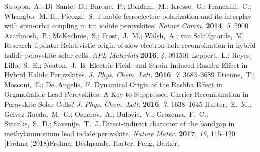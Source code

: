 \documentclass[journal=jpccck,manuscript=article,layout=twocolumn]{achemso}
\begin{document}
\begin{mcitethebibliography}{62}
\EndOfBibitem
{}
Stroppa,~A.; Di~Sante,~D.; Barone,~P.; Bokdam,~M.; Kresse,~G.; Franchini,~C.;
  Whangbo,~M.-H.; Picozzi,~S. Tunable ferroelectric polarization and its
  interplay with spin-orbit coupling in tin iodide perovskites. \emph{Nature
  Comm.} \textbf{2014}, \emph{5}, 5900\relax
\mciteBstWouldAddEndPuncttrue
\mciteSetBstMidEndSepPunct{\mcitedefaultmidpunct}
{\mcitedefaultendpunct}{\mcitedefaultseppunct}\relax
\EndOfBibitem
{}
Azarhoosh,~P.; McKechnie,~S.; Frost,~J.~M.; Walsh,~A.; van Schilfgaarde,~M.
  Research Update: Relativistic origin of slow electron-hole recombination in
  hybrid halide perovskite solar cells. \emph{APL Materials} \textbf{2016},
  \emph{4}, 091501\relax
\mciteBstWouldAddEndPuncttrue
\mciteSetBstMidEndSepPunct{\mcitedefaultmidpunct}
{\mcitedefaultendpunct}{\mcitedefaultseppunct}\relax
\EndOfBibitem
{}
Leppert,~L.; Reyes-Lillo,~S.~E.; Neaton,~J.~B. Electric Field- and
  Strain-Induced Rashba Effect in Hybrid Halide Perovskites. \emph{J. Phys.
  Chem. Lett.} \textbf{2016}, \emph{7}, 3683--3689\relax
\mciteBstWouldAddEndPuncttrue
\mciteSetBstMidEndSepPunct{\mcitedefaultmidpunct}
{\mcitedefaultendpunct}{\mcitedefaultseppunct}\relax
\EndOfBibitem
{}
Etienne,~T.; Mosconi,~E.; De~Angelis,~F. Dynamical Origin of the Rashba Effect
  in Organohalide Lead Perovskites: A Key to Suppressed Carrier Recombination
  in Perovskite Solar Cells? \emph{J. Phys. Chem. Lett.} \textbf{2016},
  \emph{7}, 1638--1645\relax
\mciteBstWouldAddEndPuncttrue
\mciteSetBstMidEndSepPunct{\mcitedefaultmidpunct}
{\mcitedefaultendpunct}{\mcitedefaultseppunct}\relax
\EndOfBibitem
{}
Hutter,~E.~M.; Gelvez-Rueda,~M.~C.; Osherov,~A.; Bulovic,~V.; Grozema,~F.~C.;
  Stranks,~S.~D.; Savenije,~T.~J. Direct-indirect character of the bandgap in
  methylammonium lead iodide perovskite. \emph{Nature Mater.} \textbf{2017},
  \emph{16}, 115--120\relax
\mciteBstWouldAddEndPuncttrue
\mciteSetBstMidEndSepPunct{\mcitedefaultmidpunct}
{\mcitedefaultendpunct}{\mcitedefaultseppunct}\relax
\EndOfBibitem
\bibitem[Frohna (2018)Frohna, Deshpande, Harter, Peng, Barker,

\end{mcitethebibliography}
\end{document}
